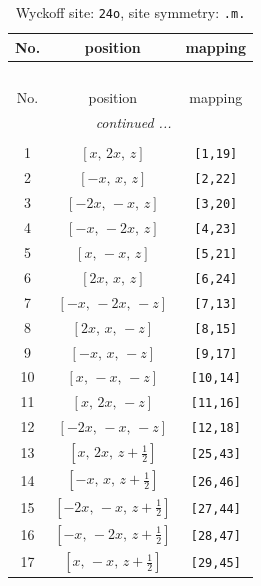 \documentclass[fleqn,8pt]{jsarticle}
\begin{document}
\begin{longtable}{ccc}
\caption{Wyckoff site: {\tt 24o}, site symmetry: {\tt .m.}}
 \\
 \hline \hline
No. & position & mapping \\ \hline \endfirsthead

\multicolumn{2}{l}{\tablename\ \thetable{}} \\
 \hline \hline
No. & position & mapping \\ \hline \endhead

 \hline \hline
\multicolumn{2}{r}{\footnotesize\it continued ...} \\ \endfoot

 \hline \hline
\multicolumn{2}{r}{} \\ \endlastfoot

1 & $\left[ x,\, 2 x,\, z \right]$ & {\tt [1,19]} \\ \hline
2 & $\left[ - x,\, x,\, z \right]$ & {\tt [2,22]} \\ \hline
3 & $\left[ - 2 x,\, - x,\, z \right]$ & {\tt [3,20]} \\ \hline
4 & $\left[ - x,\, - 2 x,\, z \right]$ & {\tt [4,23]} \\ \hline
5 & $\left[ x,\, - x,\, z \right]$ & {\tt [5,21]} \\ \hline
6 & $\left[ 2 x,\, x,\, z \right]$ & {\tt [6,24]} \\ \hline
7 & $\left[ - x,\, - 2 x,\, - z \right]$ & {\tt [7,13]} \\ \hline
8 & $\left[ 2 x,\, x,\, - z \right]$ & {\tt [8,15]} \\ \hline
9 & $\left[ - x,\, x,\, - z \right]$ & {\tt [9,17]} \\ \hline
10 & $\left[ x,\, - x,\, - z \right]$ & {\tt [10,14]} \\ \hline
11 & $\left[ x,\, 2 x,\, - z \right]$ & {\tt [11,16]} \\ \hline
12 & $\left[ - 2 x,\, - x,\, - z \right]$ & {\tt [12,18]} \\ \hline
13 & $\left[ x,\, 2 x,\, z + \frac{1}{2} \right]$ & {\tt [25,43]} \\ \hline
14 & $\left[ - x,\, x,\, z + \frac{1}{2} \right]$ & {\tt [26,46]} \\ \hline
15 & $\left[ - 2 x,\, - x,\, z + \frac{1}{2} \right]$ & {\tt [27,44]} \\ \hline
16 & $\left[ - x,\, - 2 x,\, z + \frac{1}{2} \right]$ & {\tt [28,47]} \\ \hline
17 & $\left[ x,\, - x,\, z + \frac{1}{2} \right]$ & {\tt [29,45]} \\ \hline

\end{longtable}
\end{document}
